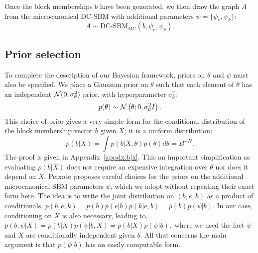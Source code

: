 Once the block memberships $b$ have been generated, we then draw the 
graph $A$ from the microcanonical DC-SBM with additional parameters 
$\psi = \{\psi_e, \psi_k\}$:
%
\begin{equation}
	A \sim \textrm{DC-SBM}_{\textrm{MC}} (b, \psi_e, \psi_k).
	\label{eqn:A-generation}
\end{equation}

\subsection{Prior selection}

To complete the description of our Bayesian framework,
priors on $\theta$ and $\psi$ must also be specified. 
We place a Gaussian prior on $\theta$ such that
each element of $\theta$ has an independent ${\cal N}(0,\sigma_\theta^2)$
prior, with hyperparameter $\sigma_\theta^2$:
%
\begin{equation}
	p(\theta) \sim \mathcal{N} \left( \theta ; 0, \sigma_\theta^2 I \right).
	\label{eqn:theta-prior}
\end{equation}
%
This choice of prior gives a very
simple form for the conditional distribution of the block membership vector $b$ given $X$; it is a uniform distribution:
%
\begin{equation}
	p(b | X) = \int p(b | X, \theta) p(\theta) d\theta = B^{-N}.
	\label{eqn:b-pseudo-prior}
\end{equation}
%
The proof is given in Appendix~\ref{appdx:b|x}. This an important simplification as evaluating $p(b | X)$ does not require an expensive  integration over $\theta$ nor does it depend on $X$.
Peixoto \cite{Peixoto-Bayesian-Microcanonical} proposes careful choices for 
the priors on the additional microcanonical SBM parameters $\psi$, which we adopt without repeating their exact form here. 
The idea is to write the joint distribution on $(b, e, k)$ as a product of 
conditionals, $p(b, e, k) = p(b) p(e | b) p(k | e, b)= p(b) p(\psi | b)$. 
In our case, conditioning on $X$ is also necessary, leading to,
$
	p(b, \psi | X) = p(b | X) p(\psi | b, X) = p(b | X) p(\psi | b),
$
where we used the fact $\psi$ and $X$ are conditionally 
independent given $b$.
All that concerns the main argument is that $p(\psi|b)$ has
an easily computable form.
